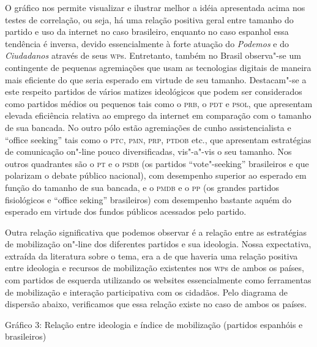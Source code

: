 O gráfico nos permite visualizar e ilustrar melhor a idéia apresentada
acima nos testes de correlação, ou seja, há uma relação positiva geral
entre tamanho do partido e uso da internet no caso brasileiro, enquanto
no caso espanhol essa tendência é inversa, devido essencialmente à forte
atuação do \emph{Podemos} e do \emph{Ciudadanos} através de seus \textsc{wp}s.
Entretanto, também no Brasil observa"-se um contingente de pequenas
agremiações que usam as tecnologias digitais de maneira mais eficiente
do que seria esperado em virtude de seu tamanho. Destacam"-se a este
respeito partidos de vários matizes ideológicos que podem ser
considerados como partidos médios ou pequenos tais como o \textsc{prb}, o \textsc{pdt} e
\textsc{psol}, que apresentam elevada eficiência relativa ao emprego da internet
em comparação com o tamanho de sua bancada. No outro pólo estão
agremiações de cunho assistencialista e ``office seeking'' tais como o
\textsc{ptc}, \textsc{pmn}, \textsc{prp}, \textsc{ptdob} etc., que apresentam estratégias de comunicação
on"-line pouco diversificadas, vis"-a"-vis o seu tamanho. Nos outros
quadrantes são o \textsc{pt} e o \textsc{psdb} (os partidos ``vote"-seeking'' brasileiros e
que polarizam o debate público nacional), com desempenho superior ao
esperado em função do tamanho de sua bancada, e o \textsc{pmdb} e o \textsc{pp} (os
grandes partidos fisiológicos e ``office seking'' brasileiros) com
desempenho bastante aquém do esperado em virtude dos fundos públicos
acessados pelo partido.

Outra relação significativa que podemos observar é a relação entre as
estratégias de mobilização on"-line dos diferentes partidos e sua
ideologia. Nossa expectativa, extraída da literatura sobre o tema, era a
de que haveria uma relação positiva entre ideologia e recursos de
mobilização existentes nos \textsc{wp}s de ambos os países, com partidos de
esquerda utilizando os websites essencialmente como ferramentas de
mobilização e interação participativa com os cidadãos. Pelo diagrama de
dispersão abaixo, verificamos que essa relação existe no caso de ambos
os países.

\pagebreak

\begin{center}
Gráfico 3: Relação entre ideologia e índice de mobilização (partidos
espanhóis e brasileiros)
\end{center}

